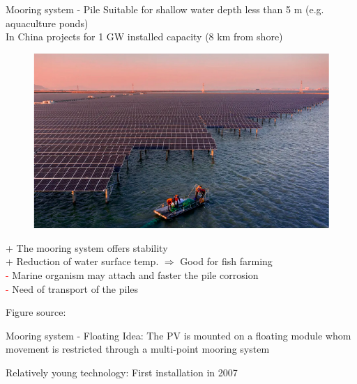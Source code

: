 \documentclass[aspectratio=169, 12pt]{beamer}
\begin{document}
\begin{frame}{Mooring system - Pile}
  Suitable for shallow water depth less than 5 m (e.g. aquaculture ponds)\\
  In China projects for 1 GW installed capacity (8 km from shore)

  \begin{figure}
    \centering
    \includegraphics[width=0.3\columnwidth]{figure/floating_PV_china.png}
  \end{figure}

  \textcolor{NTNUgreen}{+} The mooring system offers stability\\
  \textcolor{NTNUgreen}{+} Reduction of water surface temp. $\Rightarrow$ Good for fish farming\\
  \textcolor{red}{-} Marine organism may attach and faster the pile corrosion\\
  \textcolor{red}{-} Need of transport of the piles

  {\tiny Figure source: \cite{jmse11112064}}
\end{frame}

\begin{frame}{Mooring system - Floating}
  \textcolor{NTNUBlue}{Idea:} The PV is mounted on a floating module whom movement is restricted through a multi-point mooring system 
  
  \textcolor{NTNUBlue}{Relatively young technology: }First installation in 2007

\end{frame}
\end{document}
